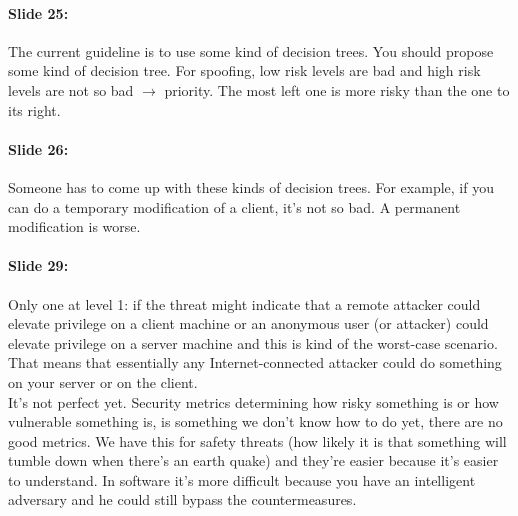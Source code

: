 \documentclass[10pt,a4paper]{report}
\begin{document}
\paragraph{Slide 25:} The current guideline is to use some kind of decision trees. You should propose some kind of decision tree. For spoofing, low risk levels are bad and high risk levels are not so bad $\rightarrow$ priority. The most left one is more risky than the one to its right.

\paragraph{Slide 26:} Someone has to come up with these kinds of decision trees. For example, if you can do a temporary modification of a client, it's not so bad. A permanent modification is worse.

\paragraph{Slide 29:} Only one at level 1: if the threat might indicate that a remote attacker could elevate privilege on a client machine or an anonymous user (or attacker) could elevate privilege on a server machine and this is kind of the worst-case scenario. That means that essentially any Internet-connected attacker could do something on your server or on the client. \\
It's not perfect yet. Security metrics determining how risky something is or how vulnerable something is, is something we don't know how to do yet, there are no good metrics. We have this for safety threats (how likely it is that something will tumble down when there's an earth quake) and they're easier because it's easier to understand. In software it's more difficult because you have an intelligent adversary and he could still bypass the countermeasures.
\end{document}
